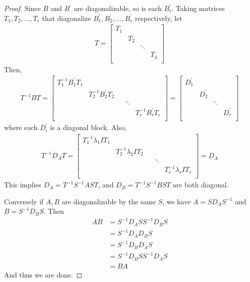 \documentclass[11pt]{article}
\theoremstyle{plain} %
\theoremstyle{definition} %
\theoremstyle{remark} %
\begin{document}
\begin{proof}
  Since $B$ and $B^\prime$ are diagonalizable, so is each
  $B_i^\prime$. Taking matrices $T_1 , T_2 , \ldots , T_r$ that
  diagonalize $B^\prime_1 ,  B^\prime_2 , \ldots , B^\prime_r$
  respectively, let
  \begin{align*}
    T =
    \begin{bmatrix}%
      T_1&  &  &  \\
      & T_2 &  &  \\
      &  & \ddots &  \\
      &  &  & T_4 \\
    \end{bmatrix}
  \end{align*}
  Then,
  \begin{align*}
    T^{-1} B T =
    \begin{bmatrix}
      T_1^{-1}B_1^\prime T_1 &  &  & \\
      & T_2^{-1}B_2^\prime T_2 &   & \\
      &  &  & \ddots  & \\
      &  & &   & T_r^{-1} B_r^\prime T_r \\
    \end{bmatrix} =
    \begin{bmatrix}%
      D_1^\prime&  &  &  \\
      &  D_2^\prime&  &  \\
      &  &  \ddots&  \\
      &  &  & D_r^\prime \\
    \end{bmatrix}
  \end{align*} where each $D_i^\prime$ is a diagonal block.
  Also,
  \begin{align*}
    T^{-1} D_A T =
    \begin{bmatrix}
      T_1^{-1}\lambda_1 I T_1 &  &  & \\
      & T_2^{-1}\lambda_2 IT_2 &   & \\
      &  &  & \ddots  & \\
      &  & &   & T_r^{-1} \lambda_r I T_r \\
    \end{bmatrix} = D_A
  \end{align*}
  This implies $D_A = T^{-1} S^{-1} A S T$, and $D_B = T^{-1} S^{-1}
  B ST$ are both diagonal.

  Conversely if $A, B$ are diagonalizable by the same $S$, we have $A
  = SD_AS^{-1}$ and $B = S^{-1}D_BS$. Then
  \begin{align*}
    AB &= S^{-1}D_ASS^{-1}D_BS \\
    &= S^{-1}D_AD_B S \\
    &= S^{-1}D_BD_AS \\
    &=S^{-1}D_BSS^{-1}D_AS \\
    &= BA
  \end{align*}
  And thus we are done.
\end{proof}
\end{document}
